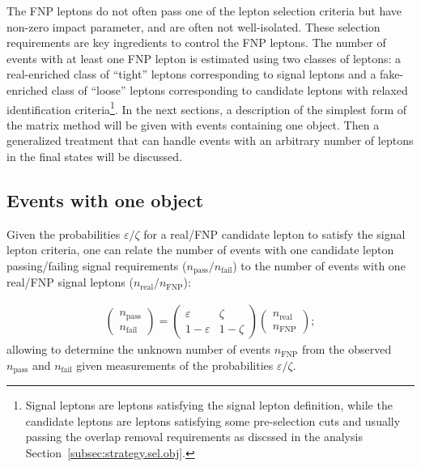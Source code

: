 The FNP leptons do not often pass one of the 
lepton selection criteria but have non-zero impact parameter, and are often not 
well-isolated. These selection requirements are key ingredients to control the FNP leptons. 
The number of events with at least one FNP lepton is estimated using two classes of leptons: 
a real-enriched class of ``tight'' leptons corresponding to signal leptons and a fake-enriched class of ``loose'' leptons 
corresponding to candidate leptons with relaxed identification criteria\footnote{Signal leptons are leptons satisfying the signal lepton definition, while the candidate leptons are leptons satisfying some pre-selection cuts and usually passing the overlap removal requirements as discssed in the analysis 
Section~\ref{subsec:strategy.sel.obj}.}. 
In the next sections, a description of the simplest form of the matrix method will be given with events containing one object. 
Then a generalized treatment that can handle events with an arbitrary number of leptons in the final states will be discussed.

\subsection{Events with one object}

Given the probabilities $\varepsilon/\zeta$ for a real/FNP candidate lepton to satisfy the signal lepton criteria, 
one can relate the number of events with one candidate lepton passing/failing signal requirements ($n_\text{pass}/n_\text{fail}$) to the number of events with one real/FNP signal leptons ($n_\text{real}/n_\text{FNP}$):

\begin{align}
\begin{pmatrix}n_\text{pass}\\n_\text{fail}\end{pmatrix} 
= \begin{pmatrix}\varepsilon & \zeta\\ 1-\varepsilon & 1-\zeta\end{pmatrix}
\begin{pmatrix}n_\text{real}\\n_\text{FNP}\end{pmatrix}; 
\label{eqn:matrix_method}
\end{align}
allowing to determine the unknown number of events $n_\text{FNP}$ from the observed $n_\text{pass}$ and $n_\text{fail}$ given measurements of the 
probabilities $\varepsilon/\zeta$. 

